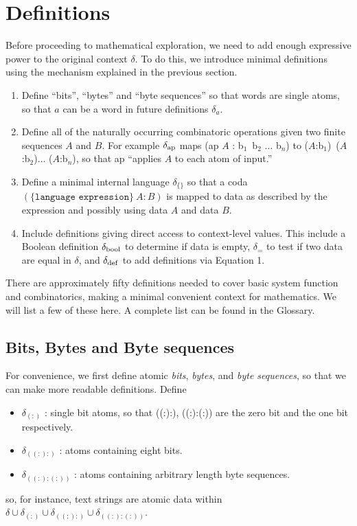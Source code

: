 \documentclass[11pt]{article}
\begin{document}
\section{Definitions}

     Before proceeding to mathematical exploration, we need to add enough expressive power to the original context $\delta$.  To do this, 
we introduce minimal definitions using the mechanism explained in the previous section.  

\begin{enumerate}
\item {Define ``bits'', ``bytes'' and ``byte sequences'' so that words are single atoms, so that $a$ can be a word in future definitions $\delta_a$.}
\item {Define all of the naturally occurring combinatoric operations given two finite sequences $A$ and $B$.  For example $\delta_{\rm ap}$
maps (ap $A$ : b$_1$\ b$_2$ $\dots$ b$_n$) to ($A$:b$_1$)\ ($A$:b$_2$)$\dots$ ($A$:b$_n$), so that ap ``applies $A$ to each atom of input.'' }
\item {Define a minimal internal language $\delta_{\{\}}$ so that a coda $(\{\texttt{language expression}\}\ A : B)$ is mapped to data as described by 
the expression and possibly using data $A$ and data $B$.}
\item {Include definitions giving direct access to context-level values.  This include a Boolean definition $\delta_{\rm bool}$ to determine if data is empty, 
$\delta_{=}$ to test if two data are equal in $\delta$, and $\delta_{\rm def}$ to add definitions via Equation 1.} 
\end{enumerate}
There are approximately fifty definitions needed to cover basic system function and combinatorics, making a minimal convenient context for mathematics.  
We will list a few of these here.  A complete list can be found 
in the Glossary.  

\subsection{Bits, Bytes and Byte sequences}

For convenience, we first define atomic {\it bits}, {\it bytes}, and {\it byte sequences}, so that we can make 
more readable definitions.  Define 
\begin{itemize}
\item{$\delta_{(:)}$ : single bit atoms, so that ((:):), ((:):(:)) are the zero bit and the one bit respectively.}
\item{$\delta_{((:):)}$ : atoms containing eight bits.}
\item{$\delta_{((:):(:))}$ : atoms containing arbitrary length byte sequences.}
\end{itemize}
so, for instance, text strings are atomic data within $\delta\cup\delta_{(:)}\cup\delta_{((:):)}\cup\delta_{((:):(:))}$.  
\end{document}
